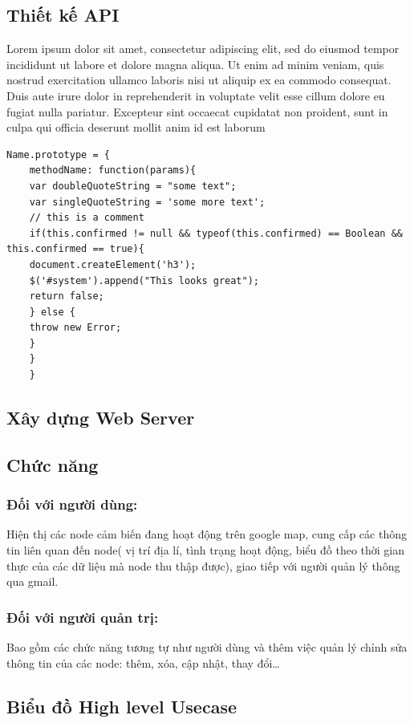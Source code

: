 \subsection{Thiết kế API}
Lorem ipsum dolor sit amet, consectetur adipiscing elit, sed do eiusmod tempor incididunt ut labore et dolore magna aliqua. Ut enim ad minim veniam, quis nostrud exercitation ullamco laboris nisi ut aliquip ex ea commodo consequat. Duis aute irure dolor in reprehenderit in voluptate velit esse cillum dolore eu fugiat nulla pariatur. Excepteur sint occaecat cupidatat non proident, sunt in culpa qui officia deserunt mollit anim id est laborum

	\begin{lstlisting}[caption=My Javascript Example]
	Name.prototype = {
	methodName: function(params){
	var doubleQuoteString = "some text";
	var singleQuoteString = 'some more text';
	// this is a comment
	if(this.confirmed != null && typeof(this.confirmed) == Boolean && this.confirmed == true){
	document.createElement('h3');
	$('#system').append("This looks great");
	return false;
	} else {
	throw new Error;
	}
	}
	}
	\end{lstlisting}
\subsection{Xây dựng Web Server}
\subsection*{Chức năng}

\subsubsection*{Đối với người dùng:}
Hiện thị các node cảm biến đang hoạt động trên google map, cung cấp các thông tin liên quan đến node( vị trí địa lí, tình trạng hoạt động, biểu đồ theo thời gian thực của các dữ liệu mà node thu thập được), giao tiếp với người quản lý thông qua gmail.
\subsubsection*{Đối với người quản trị:}
Bao gồm các chức năng tương tự như người dùng và thêm việc quản lý chỉnh sửa thông tin của các node: thêm, xóa, cập nhật, thay đổi…

\subsection*{Biểu đồ High level Usecase }

